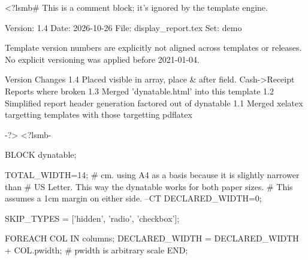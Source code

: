 <?lsmb#   This is a comment block; it's ignored by the template engine.

   Version:  1.4
   Date:     2026-10-26
   File:     display_report.tex
   Set:      demo

Template version numbers are explicitly not aligned across templates or
releases. No explicit versioning was applied before 2021-01-04.

Version   Changes
1.4       Placed visible in array, place & after field. 
          Cash->Receipt Reports where broken
1.3       Merged 'dynatable.html' into this template
1.2       Simplified report header generation factored out of dynatable
1.1       Merged xelatex targetting templates with those targetting pdflatex


-?>
<?lsmb-

BLOCK dynatable;

    TOTAL_WIDTH=14; # cm. using A4 as a basis because it is slightly narrower than
                    # US Letter. This way the dynatable works for both paper sizes.
                    # This assumes a 1cm margin on either side. --CT
    DECLARED_WIDTH=0;

    SKIP_TYPES = ['hidden', 'radio', 'checkbox'];


    FOREACH COL IN columns;
        DECLARED_WIDTH = DECLARED_WIDTH + COL.pwidth; # pwidth is arbitrary scale
    END;

